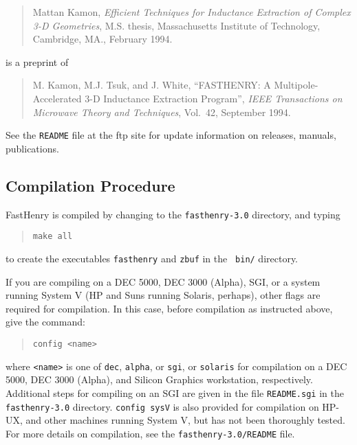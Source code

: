 \begin{quote}
\noindent
Mattan Kamon, {\em Efficient Techniques for Inductance Extraction of
Complex 3-D Geometries}, M.S. thesis, Massachusetts Institute of
Technology, Cambridge, MA., February 1994.
\end{quote}

 is a preprint of 

\begin{quote}
\noindent
M. Kamon, M.J. Tsuk, and J. White, ``FASTHENRY: A
Multipole-Accelerated 3-D Inductance Extraction Program'', {\em IEEE
Transactions on Microwave Theory and Techniques}, Vol.~42, 
September 1994.
\end{quote}

\noindent See the {\tt README} file at the ftp site for update information on
releases, manuals, publications.

\subsection{Compilation Procedure}

FastHenry is compiled by changing to the {\tt fasthenry-3.0} directory, 
and typing
\begin{quote}
\begin{verbatim}
make all
\end{verbatim}
\end{quote}
to create the executables {\tt fasthenry} and {\tt zbuf} in the {\tt
bin/} directory.

If you are compiling on a DEC 5000, DEC 3000 (Alpha), SGI, or a system
running System V (HP and Suns running Solaris, perhaps), 
other flags are required for compilation.  In this
case, before compilation as instructed above, give the command:
\begin{quote}
\begin{verbatim}
config <name>
\end{verbatim}
\end{quote}
where {\tt <name>} is one of {\tt dec}, {\tt alpha}, or {\tt sgi}, or
{\tt solaris} for
compilation on a DEC 5000, DEC 3000 (Alpha), and Silicon Graphics
workstation, respectively.  Additional steps for compiling on an SGI
are given in the file {\tt README.sgi} in the {\tt fasthenry-3.0}
directory. {\tt config sysV} is also provided for
compilation on HP-UX, and other machines running System V,
but has not been thoroughly tested.  For more details on compilation,
see the {\tt fasthenry-3.0/README} file.

